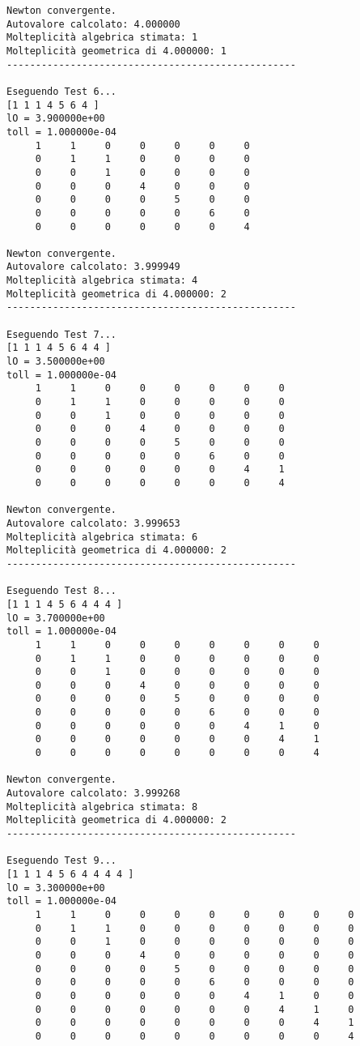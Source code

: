 \documentclass[12pt]{article}
\begin{document}
\begin{verbatim}
Newton convergente.
Autovalore calcolato: 4.000000
Molteplicità algebrica stimata: 1
Molteplicità geometrica di 4.000000: 1
--------------------------------------------------

Eseguendo Test 6...
[1 1 1 4 5 6 4 ]
lO = 3.900000e+00
toll = 1.000000e-04
     1     1     0     0     0     0     0
     0     1     1     0     0     0     0
     0     0     1     0     0     0     0
     0     0     0     4     0     0     0
     0     0     0     0     5     0     0
     0     0     0     0     0     6     0
     0     0     0     0     0     0     4

Newton convergente.
Autovalore calcolato: 3.999949
Molteplicità algebrica stimata: 4
Molteplicità geometrica di 4.000000: 2
--------------------------------------------------

Eseguendo Test 7...
[1 1 1 4 5 6 4 4 ]
lO = 3.500000e+00
toll = 1.000000e-04
     1     1     0     0     0     0     0     0
     0     1     1     0     0     0     0     0
     0     0     1     0     0     0     0     0
     0     0     0     4     0     0     0     0
     0     0     0     0     5     0     0     0
     0     0     0     0     0     6     0     0
     0     0     0     0     0     0     4     1
     0     0     0     0     0     0     0     4

Newton convergente.
Autovalore calcolato: 3.999653
Molteplicità algebrica stimata: 6
Molteplicità geometrica di 4.000000: 2
--------------------------------------------------

Eseguendo Test 8...
[1 1 1 4 5 6 4 4 4 ]
lO = 3.700000e+00
toll = 1.000000e-04
     1     1     0     0     0     0     0     0     0
     0     1     1     0     0     0     0     0     0
     0     0     1     0     0     0     0     0     0
     0     0     0     4     0     0     0     0     0
     0     0     0     0     5     0     0     0     0
     0     0     0     0     0     6     0     0     0
     0     0     0     0     0     0     4     1     0
     0     0     0     0     0     0     0     4     1
     0     0     0     0     0     0     0     0     4

Newton convergente.
Autovalore calcolato: 3.999268
Molteplicità algebrica stimata: 8
Molteplicità geometrica di 4.000000: 2
--------------------------------------------------

Eseguendo Test 9...
[1 1 1 4 5 6 4 4 4 4 ]
lO = 3.300000e+00
toll = 1.000000e-04
     1     1     0     0     0     0     0     0     0     0
     0     1     1     0     0     0     0     0     0     0
     0     0     1     0     0     0     0     0     0     0
     0     0     0     4     0     0     0     0     0     0
     0     0     0     0     5     0     0     0     0     0
     0     0     0     0     0     6     0     0     0     0
     0     0     0     0     0     0     4     1     0     0
     0     0     0     0     0     0     0     4     1     0
     0     0     0     0     0     0     0     0     4     1
     0     0     0     0     0     0     0     0     0     4


\end{verbatim}
\end{document}
